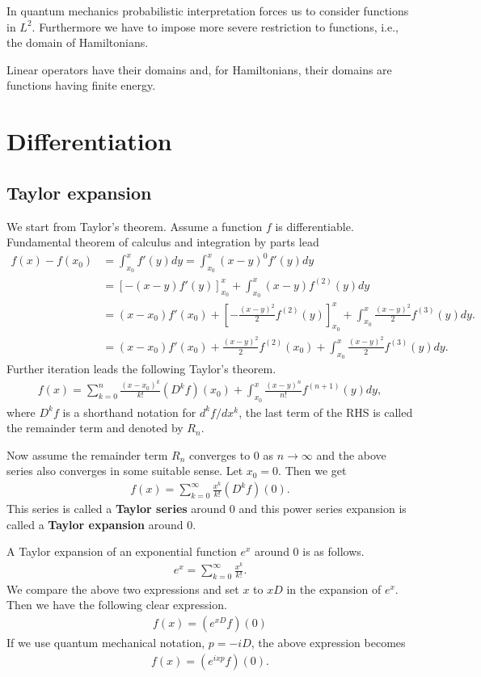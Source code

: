 \documentclass[openany, a4paper, oneside]{jsbook}
\theoremstyle{break}
\theoremstyle{breakdefn}
\newcommand{\rbk}[1]{\left (#1\right)}
\newcommand{\sqbk}[1]{\left[#1\right]}
\begin{document}
In quantum mechanics probabilistic interpretation forces us to
consider functions in $L^2$.
Furthermore we have to impose more severe restriction to functions,
i.e., the domain of Hamiltonians.

Linear operators have their domains
and, for Hamiltonians, their domains are functions having finite energy.
\section{Differentiation}

\subsection{Taylor expansion}


We start from Taylor's theorem.
Assume a function $f$ is differentiable.
Fundamental theorem of calculus and integration by parts lead
\begin{align}
 f(x) - f(x_0)
 &=
 \int_{x_0}^{x} f'(y) dy
 =
 \int_{x_0}^x (x - y)^{0} f'(y) dy \\
 &=
 \sqbk{- \rbk{x - y} f'(y)}_{x_0}^x + \int_{x_0}^x \rbk{x - y} f^{(2)} (y) dy \\
 &=
 (x - x_0) f'(x_0) + \sqbk{- \frac{(x-y)^2}{2} f^{(2)}(y)}_{x_0}^x + \int_{x_0}^x \frac{(x - y)^2}{2} f^{(3)} (y)dy. \\
 &=
 (x - x_0) f'(x_0) + \frac{(x-y)^2}{2} f^{(2)}(x_0) + \int_{x_0}^x \frac{(x - y)^2}{2} f^{(3)} (y)dy.
\end{align}
Further iteration leads the following Taylor's theorem.
\begin{align}
 f(x)
 =
 \sum_{k=0}^{n} \frac{(x - x_0)^k}{k!} \left( D^k f \right) (x_0) +
  \int_{x_0}^{x} \frac{(x - y)^{n}}{n!} f^{(n+1)} (y) dy,
\end{align}
where $D^k f$ is a shorthand notation for  $d^k f/ dx^k$,
the last term of the RHS is called the remainder term
and denoted by $R_n$.

Now assume the remainder term $R_n$ converges to 0 as $n \to \infty$
and the above series also converges in some suitable sense.
Let $x_0 = 0$.
Then we get
\begin{align}
 f(x)
 =
 \sum_{k=0}^{\infty} \frac{x^k}{k!} \left( D^k f \right) (0).
\end{align}
This series is called a \textbf{Taylor series} around 0 and
this power series expansion is called a \textbf{Taylor expansion} around 0.

A Taylor expansion of an exponential function $e^x$ around $0$ is as follows.
\begin{align}
 e^{x}
 =
 \sum_{k=0}^{\infty} \frac{x^k}{k!}.
\end{align}
We compare the above two expressions and
set $x$ to $x D$ in the expansion of $e^x$.
Then we have the following clear expression.
\begin{align}
 f(x)
 =
 \left( e^{xD} f \right) (0)
\end{align}
If we use quantum mechanical notation, $p = -i D$, the above expression becomes
\begin{align}
 f(x)
 =
 \left( e^{ixp} f \right) (0).
\end{align}
\end{document}
